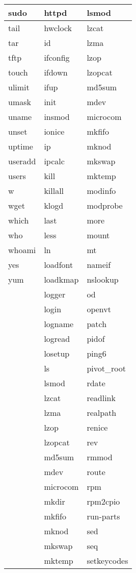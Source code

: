 \begin{longtable}{llp{50mm}}
sudo & httpd & lsmod \\ \hline
tail & hwclock & lzcat \\ \hline
tar & id & lzma \\ \hline
tftp & ifconfig & lzop \\ \hline
touch & ifdown & lzopcat \\ \hline
ulimit & ifup & md5sum \\ \hline
umask & init & mdev \\ \hline
uname & insmod & microcom \\ \hline
unset & ionice & mkfifo \\ \hline
uptime & ip & mknod \\ \hline
useradd & ipcalc & mkswap \\ \hline
users & kill & mktemp \\ \hline
w & killall & modinfo \\ \hline
wget & klogd & modprobe \\ \hline
which & last & more \\ \hline
who & less & mount \\ \hline
whoami & ln & mt \\ \hline
yes & loadfont & nameif \\ \hline
yum & loadkmap & nslookup \\ \hline
 & logger & od \\ \hline
 & login & openvt \\ \hline
 & logname & patch \\ \hline
 & logread & pidof \\ \hline
 & losetup & ping6 \\ \hline
 & ls & pivot\_root \\ \hline
 & lsmod & rdate \\ \hline
 & lzcat & readlink \\ \hline
 & lzma & realpath \\ \hline
 & lzop & renice \\ \hline
 & lzopcat & rev \\ \hline
 & md5sum & rmmod \\ \hline
 & mdev & route \\ \hline
 & microcom & rpm \\ \hline
 & mkdir & rpm2cpio \\ \hline
 & mkfifo & run-parts \\ \hline
 & mknod & sed \\ \hline
 & mkswap & seq \\ \hline
 & mktemp & setkeycodes \\ \hline

\end{longtable}
